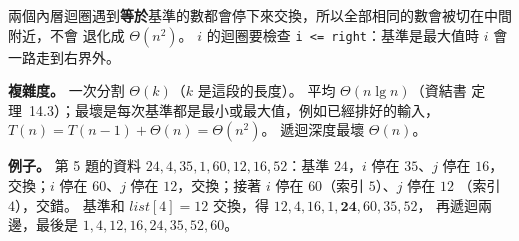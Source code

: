 \begin{pastsoln}
兩個內層迴圈遇到\textbf{等於}基準的數都會停下來交換，所以全部相同的數會被切在中間附近，不會
退化成 $\Theta(n^2)$。 $i$ 的迴圈要檢查 \texttt{i <= right}：基準是最大值時 $i$ 會一路走到右界外。

\textbf{複雜度。} 一次分割 $\Theta(k)$（$k$ 是這段的長度）。 平均 $\Theta(n \lg n)$（資結書
定理~14.3）；最壞是每次基準都是最小或最大值，例如已經排好的輸入，$T(n) = T(n-1) + \Theta(n)
= \Theta(n^2)$。 遞迴深度最壞 $\Theta(n)$。

\textbf{例子。} 第 5 題的資料 $24, 4, 35, 1, 60, 12, 16, 52$：基準 $24$，$i$ 停在 $35$、$j$ 停在
$16$，交換；$i$ 停在 $60$、$j$ 停在 $12$，交換；接著 $i$ 停在 $60$（索引 $5$）、$j$ 停在 $12$
（索引 $4$），交錯。 基準和 $\mathit{list}[4] = 12$ 交換，得 $12, 4, 16, 1, \mathbf{24}, 60, 35, 52$，
再遞迴兩邊，最後是 $1, 4, 12, 16, 24, 35, 52, 60$。
\end{pastsoln}
